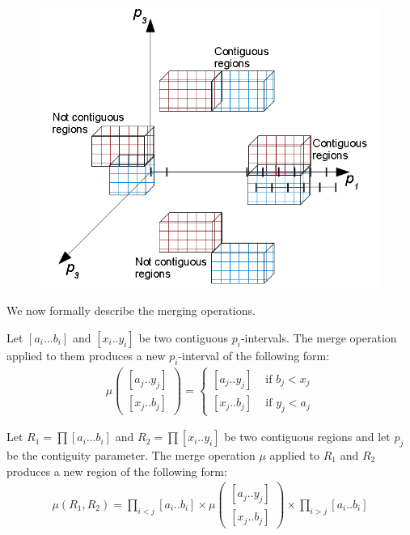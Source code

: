 	\begin{figure}[t]
		\center
		\includegraphics[width=0.8\columnwidth]{img/contiguous_regions}
	\end{figure}

We now formally describe the merging operations.
\begin{definition}
Let $\left[a_{i}\dots b_{i}\right]$ and $\left[x_{i}..y_{i}\right]$ be two contiguous $p_i$-intervals. The merge operation applied to them produces a new $p_i$-interval of the following form:
	\begin{align}
		\mu	 \left( \begin{array}{l}
				\left[a_{j}..y_{j}\right] \\
				\left[x_{j}..b_{j}\right]
		     \end{array} \right)
		=\begin{cases}
			\left[a_{j}..y_{j}\right] & \mbox{ if }b_{j}<x_{j}\\
			\left[x_{j}..b_{j}\right] & \mbox{ if }y_{j}<a_{j}
		\end{cases}
	\end{align}

\end{definition}

\begin{definition}
Let $R_{1}=\prod\left[a_{i}\dots b_{i}\right]$ and $R_{2}=\prod\left[x_{i}..y_{i}\right]$ be two contiguous regions and let $p_j$ be the contiguity parameter. 
The merge operation $\mu$ applied to $R_1$ and $R_2$ produces a new region of the following form:
	\begin{align}
		\mu(R_1,R_2)=\prod_{i<j}\left[a_{i}..b_{i}\right]
		\times
		\mu	 \left( \begin{array}{l}
				\left[a_{j}..y_{j}\right] \\
				\left[x_{j}..b_{j}\right]
		     \end{array} \right)
		\times
		\prod_{i>j}\left[a_{i}..b_{i}\right]
	\end{align}
\end{definition}

